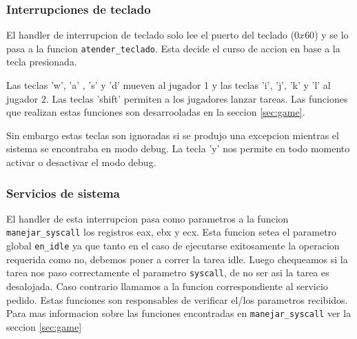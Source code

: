 \subsubsection{Interrupciones de teclado}
\label{subsec:int-teclado}
El handler de interrupcion de teclado solo lee el puerto del teclado ($0x60$) y se lo pasa a la funcion \verb|atender_teclado|. Esta decide el curso de accion en base a la tecla presionada. 

Las teclas 'w', 'a' , 's' y 'd' mueven al jugador 1 y las teclas 'i', 'j', 'k' y 'l' al jugador 2. Las teclas 'shift' permiten a los jugadores lanzar tareas. Las funciones que realizan estas funciones son desarrooladas en la seccion \ref{sec:game}. 

Sin embargo estas teclas son ignoradas si se produjo una excepcion mientras el sistema se encontraba en modo debug. La tecla 'y' nos permite en todo momento activar o desactivar el modo debug.


\subsubsection{Servicios de sistema}

El handler de esta interrupcion pasa como parametros a la funcion \verb|manejar_syscall| los registros eax, ebx y ecx. Esta funcion setea el parametro global \verb|en_idle| ya que tanto en el caso de ejecutarse exitosamente la operacion requerida como no, debemos poner a correr la tarea idle. Luego chequeamos si la tarea nos paso correctamente el parametro \verb|syscall|, de no ser asi la tarea es desalojada. Caso contrario llamamos a la funcion correspondiente al servicio pedido. Estas funciones son responsables de verificar el/los parametros recibidos.
Para mas informacion sobre  las funciones encontradas en \verb|manejar_syscall| ver la seccion \ref{sec:game}

